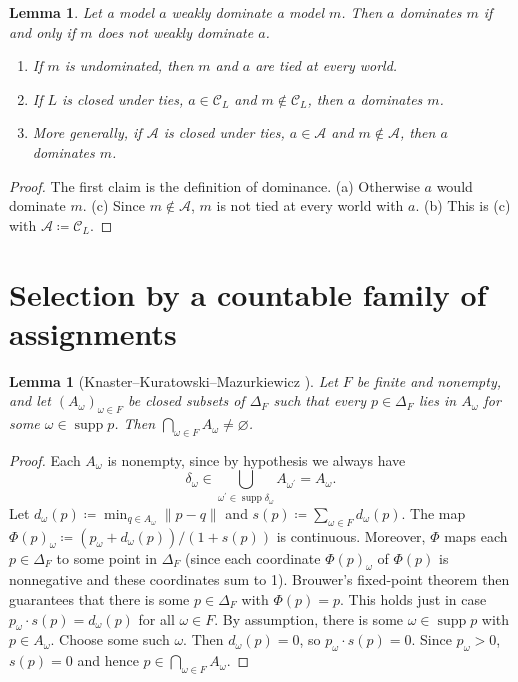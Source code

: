 \documentclass[11pt]{article}
\newtheorem{lemma}[theorem]{Lemma}
\theoremstyle{definition}
\theoremstyle{remark}
\newcommand{\C}{\mathcal C}
\newcommand{\supp}{\operatorname{supp}}
\begin{document}
\begin{lemma}\label{lem:ties}
Let a model $a$ weakly dominate a model $m$. Then $a$ dominates $m$ if and only if $m$ does not weakly dominate $a$.
\begin{enumerate}[label=(\alph*)]
\item If $m$ is undominated, then $m$ and $a$ are tied at every world.
\item If $L$ is closed under ties, $a\in\C_L$ and $m\notin\C_L$, then $a$ dominates $m$.
\item More generally, if $\mathcal A$ is closed under ties, $a\in\mathcal A$ and $m\notin\mathcal A$, then $a$ dominates $m$.
\end{enumerate}
\end{lemma}
\begin{proof}
The first claim is the definition of dominance. (a) Otherwise $a$ would dominate $m$. (c) Since $m\notin\mathcal A$, $m$ is not tied at every world with $a$. (b) This is (c) with $\mathcal A\coloneqq\C_L$.
\end{proof}

\section{Selection by a countable family of assignments}\label{sec:general}

\begin{lemma}[Knaster--Kuratowski--Mazurkiewicz {\cite{KKM1929}}]\label{lem:kkm}
Let $F$ be finite and nonempty, and let $(A_\omega)_{\omega\in F}$ be closed subsets of $\Delta_F$ such that every $p\in\Delta_F$ lies in $A_\omega$ for some $\omega\in\supp p$. Then $\bigcap_{\omega\in F}A_\omega\ne\varnothing$.
\end{lemma}
\begin{proof}
Each $A_\omega$ is nonempty, since by hypothesis we always have
\[
\delta_\omega\in\bigcup_{\omega^\prime\in\supp \delta_\omega}A_{\omega^\prime}=A_\omega.
\]
Let $d_\omega(p)\coloneqq\min_{q\in A_\omega}\lVert p-q \rVert$ and $s(p)\coloneqq\sum_{\omega\in F} d_\omega(p)$. The map $\Phi(p)_\omega\coloneqq(p_\omega+d_\omega(p))/(1+s(p))$ is continuous. Moreover, $\Phi$ maps each $p\in\Delta_F$ to some point in $\Delta_F$ (since each coordinate $\Phi(p)_\omega$ of $\Phi(p)$ is nonnegative and these coordinates sum to 1). Brouwer's fixed-point theorem then guarantees that there is some $p\in\Delta_F$ with $\Phi(p)=p$. This holds just in case $p_\omega\cdot s(p)=d_\omega(p)$ for all $\omega\in F$. By assumption, there is some $\omega\in\supp p$ with $p\in A_\omega$. Choose some such $\omega$. Then $d_\omega(p)=0$, so $p_\omega\cdot s(p)=0$. Since $p_\omega>0$, $s(p)=0$ and hence $p\in\bigcap_{\omega\in F}A_\omega$.
\end{proof}
\end{document}
